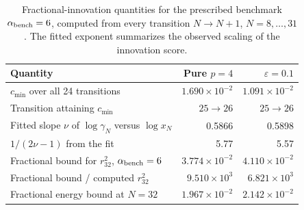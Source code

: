 \begin{table}[!htbp]
\centering
\small
\caption{Fractional-innovation quantities for the prescribed benchmark \(\alpha_{\rm bench}=6\), computed from every transition \(N\to N+1\), \(N=8,\ldots,31\). The fitted exponent summarizes the observed scaling of the innovation score.}
\label{tab:fractional-p4}
\begin{tabularx}{\linewidth}{@{}Xrr@{}}
\toprule
Quantity & Pure \(p=4\) & \(\varepsilon=0.1\) \\
\midrule
\(c_{\min}\) over all 24 transitions & \(1.690\times10^{-2}\) & \(1.091\times10^{-2}\) \\
Transition attaining \(c_{\min}\) & \(25\to26\) & \(25\to26\) \\
Fitted slope \(\nu\) of \(\log\gamma_N\) versus \(\log x_N\) & 0.5866 & 0.5898 \\
\(1/(2\nu-1)\) from the fit & 5.77 & 5.57 \\
Fractional bound for \(r_{32}^2\), \(\alpha_{\rm bench}=6\) & \(3.774\times10^{-2}\) & \(4.110\times10^{-2}\) \\
Fractional bound / computed \(r_{32}^2\) & \(9.510\times10^{3}\) & \(6.821\times10^{3}\) \\
Fractional energy bound at \(N=32\) & \(1.967\times10^{-2}\) & \(2.142\times10^{-2}\) \\
\bottomrule
\end{tabularx}
\end{table}
